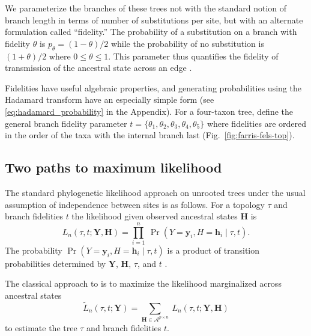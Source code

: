 \documentclass{article}
\newcommand{\alphabet}{\mathcal{A}}
\newcommand{\fullAlignment}{\mathbf{Y}}
\newcommand{\alignmentColumn}{\mathbf{y}}
\newcommand{\alignmentColumnRV}{Y}
\newcommand{\fullAncestralStates}{\mathbf{H}}
\newcommand{\ancestralStateColumn}{\mathbf{h}}
\newcommand{\ancestralStateColumnRV}{H}
\newcommand{\nCols}{n}
\newcommand{\nAncestralStateRows}{p}
\begin{document}
We parameterize the branches of these trees not with the standard notion of branch length in terms of number of substitutions per site, but with an alternate formulation called ``fidelity.''
The probability of a substitution on a branch with fidelity $\theta$ is $p_\theta = (1-\theta)/2$ while the probability of no substitution is $(1+\theta)/2$ where $0 \le \theta \le 1$.
This parameter thus quantifies the fidelity of transmission of the ancestral state across an edge \cite{Matsen2007-jq}.

Fidelities have useful algebraic properties, and generating probabilities using the Hadamard transform have an especially simple form (see \eqref{eq:hadamard_probability} in the Appendix).
For a four-taxon tree, define the general branch fidelity parameter $t=\{\theta_1,\theta_2,\theta_3,\theta_4,\theta_5\}$ where fidelities are ordered in the order of the taxa with the internal branch last (Fig.~\ref{fig:farris-fels-top}).

\subsection*{Two paths to maximum likelihood}

The standard phylogenetic likelihood approach on unrooted trees under the usual assumption of independence between sites is as follows.
For a topology $\tau$ and branch fidelities $t$ the likelihood given observed ancestral states $\fullAncestralStates$ is
\begin{equation}
\label{eq:full_likelihood}
L_\nCols(\tau, t; \fullAlignment,\fullAncestralStates) = \prod_{i=1}^{\nCols} \ \Pr(\alignmentColumnRV=\alignmentColumn_i, \ancestralStateColumnRV=\ancestralStateColumn_i \mid \tau, t).
\end{equation}
The probability $\Pr(\alignmentColumnRV=\alignmentColumn_i, \ancestralStateColumnRV=\ancestralStateColumn_i \mid \tau, t)$ is a product of transition probabilities determined by $\fullAlignment$, $\fullAncestralStates$, $\tau$, and $t$ \cite{Felsenstein2004}.

The classical approach to is to maximize the likelihood marginalized across ancestral states
\begin{equation}
\label{eq:marginal_likelihood}
\tilde{L}_\nCols(\tau, t; \fullAlignment) = \sum_{\fullAncestralStates\in\alphabet^{\nAncestralStateRows\times\nCols}} \ L_\nCols(\tau, t; \fullAlignment, \fullAncestralStates)
\end{equation}
to estimate the tree $\tau$ and branch fidelities $t$.
\end{document}
